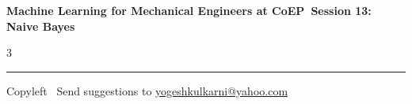 \documentclass[8pt,landscape]{article}
\begin{document}
\footnotesize

\begin{center}
\Large{\textbf{Machine Learning for Mechanical Engineers at CoEP\ Session 13: Naive Bayes}}
\end{center}

\begin{multicols}{3}

\end{multicols}

\rule{\linewidth}{0.25pt}
\scriptsize
Copyleft \textcopyleft\  Send suggestions to
\href{http://www.yogeshkulkarni.com}{yogeshkulkarni@yahoo.com}
\end{document}
